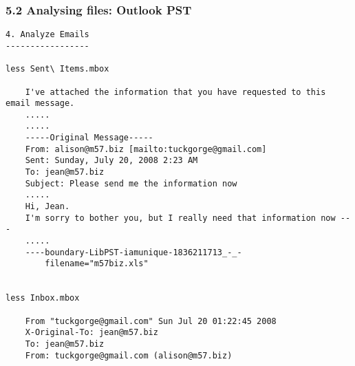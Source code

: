 \begin{frame}[fragile]
  \frametitle{5.2 Analysing files: Outlook PST}
    \begin{lstlisting}[basicstyle=\tiny]
4. Analyze Emails
-----------------

less Sent\ Items.mbox 

    I've attached the information that you have requested to this email message.
    .....
    .....
    -----Original Message-----
    From: alison@m57.biz [mailto:tuckgorge@gmail.com]
    Sent: Sunday, July 20, 2008 2:23 AM
    To: jean@m57.biz
    Subject: Please send me the information now
    .....
    Hi, Jean.
    I'm sorry to bother you, but I really need that information now ---
    .....
    ----boundary-LibPST-iamunique-1836211713_-_-
        filename="m57biz.xls"


less Inbox.mbox

    From "tuckgorge@gmail.com" Sun Jul 20 01:22:45 2008
    X-Original-To: jean@m57.biz
    To: jean@m57.biz
    From: tuckgorge@gmail.com (alison@m57.biz)
    \end{lstlisting}
\end{frame}


